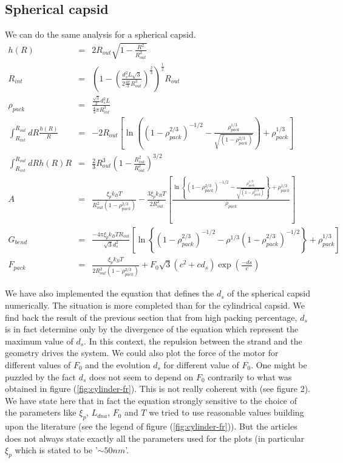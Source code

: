 \documentclass{article}
\begin{document}
\subsection{Spherical capsid}

We can do the same analysis for a spherical capsid.
\begin{eqnarray}
    h(R) &=& 2 R_{out} \sqrt{1 - \frac{R^2}{R_{out}^2}}\\
    R_{int} &=& \left(1 - \left( \frac{d_s^2 L \sqrt{3}}{2 \frac{4\pi}{3} R_{out}^3} \right) ^{\frac{2}{3}}\right)^{\frac{1}{2}} R_{out} \\
    \rho_{pack} &=& \frac{\frac{\sqrt{3}}{2} d_s^2 L}{\frac{4}{3} \pi R_{int}^3} \\
    \int_{R_{int}}^{R_{out}} dR \frac{h(R)}{R} & = & -2 R_{out} \left[ \ln \left( \left( 1 - \rho_{pack}^{2/3}\right)^{-1/2} - \frac{\rho_{pack}^{1/3}}{\sqrt{ \left(1 - \rho_{pack}^{2/3}\right)}} \right) + \rho_{pack}^{1/3} \right] \\
    \int_{R_{int}}^{R_{out}} dR h(R) R &=& \frac{2}{3} R_{out}^3 \left( 1 - \frac{R_{int}^2}{R_{out}^2} \right)^{3/2} \\
    A &=& \frac{\xi_{p} k_B T }{R_{out}^2 \left( 1 - \rho_{pack}^{2/3} \right)} - \frac{3 \xi_p k_B T}{2 R_{out}^2} \left[ \frac{ \ln \left\{ \left(  1 - \rho_{pack}^{2/3} \right)^{-1/2} - \frac{\rho_{pack}^{1/3}}{\sqrt{ \left(1 - \rho_{pack}^{2/3}\right)}} \right\} + \rho_{pack}^{1/3}}{\rho_{pack}} \right] \\
    G_{bend} &=& \frac{-4 \pi \xi_p k_B T R_{out}}{\sqrt{3} d_s^2} \left[ \ln \left\{ \left( 1 - \rho_{pack}^{2/3} \right)^{-1/2} - \rho^{1/3} \left( 1 - \rho_{pack}^{2/3} \right)^{-1/2} \right\} + \rho_{pack}^{1/3} \right] \\
    F_{pack} &=& \frac{ \xi_p k_B T}{2 R_{out}^2 \left( 1 - \rho_{pack}^{2/3} \right) } + F_0 \sqrt{3} \left( c^2 + c d_s \right) \exp \left( \frac{-ds}{c} \right)
\end{eqnarray}

We have also implemented the equation that defines the $d_s$ of the spherical capsid numerically. The situation is more completed than for the cylindrical capsid. We find back the result of the previous section that from high packing percentage, $d_s$ is in fact determine only by the divergence of the equation which represent the maximum value of $d_s$. In this context, the repulsion between the strand and the geometry drives the system. We could also plot the force of the motor for different values of $F_0$ and the evolution $d_s$ for different value of $F_0$. One might be puzzled by the fact $d_s$ does not seem to depend on $F_0$ contrarily to what was obtained in figure (\ref{fig:cylinder-fr}). This is not really coherent with \cite{purohit2003} (see figure 2). We have state here that in fact the equation strongly sensitive to the choice of the parameters like $\xi_p$, $L_{dna}$, $F_0$ and $T$ we tried to use reasonable values building upon the literature (see the legend of figure (\ref{fig:cylinder-fr})). But the articles does not always state exactly all the parameters used for the plots (in particular $\xi_p$ which is stated to be '$\sim 50nm$'.
\end{document}
